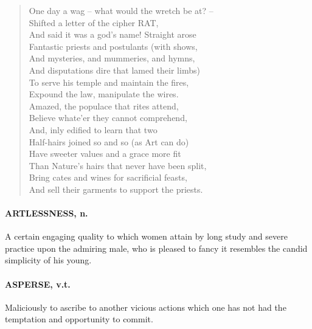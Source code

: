 \documentclass[11pt]{article}
\begin{document}
\begin{quote}   One day a wag -- what would the wretch be at? -- \\
  Shifted a letter of the cipher RAT, \\
  And said it was a god's name!  Straight arose \\
  Fantastic priests and postulants (with shows, \\
  And mysteries, and mummeries, and hymns, \\
  And disputations dire that lamed their limbs) \\
  To serve his temple and maintain the fires, \\
  Expound the law, manipulate the wires. \\
  Amazed, the populace that rites attend, \\
  Believe whate'er they cannot comprehend, \\
  And, inly edified to learn that two \\
  Half-hairs joined so and so (as Art can do) \\
  Have sweeter values and a grace more fit \\
  Than Nature's hairs that never have been split, \\
  Bring cates and wines for sacrificial feasts, \\
  And sell their garments to support the priests.  \end{quote}

\paragraph{ARTLESSNESS, n.}  A certain engaging quality to which women attain by
long study and severe practice upon the admiring male, who is pleased
to fancy it resembles the candid simplicity of his young.

\paragraph{ASPERSE, v.t.}  Maliciously to ascribe to another vicious actions which
one has not had the temptation and opportunity to commit.
\end{document}
